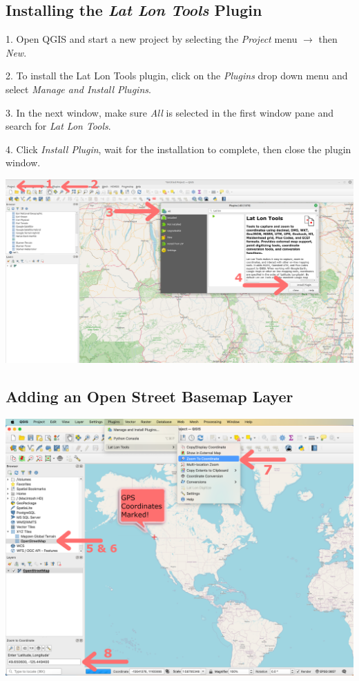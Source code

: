 \documentclass[oneside,a4paper,11pt,explicit]{book}
\begin{document}
	\subsection{Installing the \textit{Lat Lon Tools} Plugin}
	
	1. Open QGIS and start a new project by selecting the \textit{Project} menu $\rightarrow$ then \textit{New}. 
	
	2. To install the Lat Lon Tools plugin, click on the \textit{Plugins} drop down menu and select \textit{Manage and Install Plugins}.
	
	3. In the next window, make sure \textit{All} is selected in the first window pane and search for \textit{Lat Lon Tools}.
	
	4. Click \textit{Install Plugin}, wait for the installation to complete, then close the plugin window.
	
	\centerline{\includegraphics[width=\textwidth]{LatLonTools.png}}
	
	\subsection{Adding an Open Street Basemap Layer}
	
	\centerline{\includegraphics[width=.9\textwidth]{QGISbasemap.png}}
	
\end{document}
